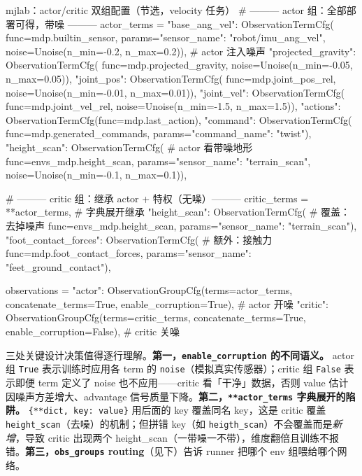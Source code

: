 \begin{codebox}[Python]{mjlab：actor/critic 双组配置（节选，velocity 任务）}
# ——— actor 组：全部部署可得，带噪 ———
actor_terms = {
    "base_ang_vel": ObservationTermCfg(
        func=mdp.builtin_sensor, params={"sensor_name": "robot/imu_ang_vel"},
        noise=Unoise(n_min=-0.2, n_max=0.2)),          # actor 注入噪声
    "projected_gravity": ObservationTermCfg(
        func=mdp.projected_gravity, noise=Unoise(n_min=-0.05, n_max=0.05)),
    "joint_pos": ObservationTermCfg(
        func=mdp.joint_pos_rel, noise=Unoise(n_min=-0.01, n_max=0.01)),
    "joint_vel": ObservationTermCfg(
        func=mdp.joint_vel_rel, noise=Unoise(n_min=-1.5, n_max=1.5)),
    "actions": ObservationTermCfg(func=mdp.last_action),
    "command": ObservationTermCfg(
        func=mdp.generated_commands, params={"command_name": "twist"}),
    "height_scan": ObservationTermCfg(                  # actor 看带噪地形
        func=envs_mdp.height_scan, params={"sensor_name": "terrain_scan"},
        noise=Unoise(n_min=-0.1, n_max=0.1)),
}

# ——— critic 组：继承 actor + 特权（无噪）———
critic_terms = {
    **actor_terms,                                      # 字典展开继承
    "height_scan": ObservationTermCfg(                  # 覆盖：去掉噪声
        func=envs_mdp.height_scan, params={"sensor_name": "terrain_scan"}),
    "foot_contact_forces": ObservationTermCfg(          # 额外：接触力
        func=mdp.foot_contact_forces,
        params={"sensor_name": "feet_ground_contact"}),
}

observations = {
    "actor":  ObservationGroupCfg(terms=actor_terms,  concatenate_terms=True,
                                  enable_corruption=True),   # actor 开噪
    "critic": ObservationGroupCfg(terms=critic_terms, concatenate_terms=True,
                                  enable_corruption=False),  # critic 关噪
}
\end{codebox}

三处关键设计决策值得逐行理解。\textbf{第一，\texttt{enable\_corruption} 的不同语义。} actor 组 \verb|True| 表示训练时应用各 term 的 \verb|noise|（模拟真实传感器）；critic 组 \verb|False| 表示即便 term 定义了 noise 也不应用——critic 看「干净」数据，否则 value 估计因噪声方差增大、advantage 信号质量下降。\textbf{第二，\texttt{**actor\_terms} 字典展开的陷阱。} \verb|{**dict, key: value}| 用后面的 key 覆盖同名 key，这是 critic 覆盖 \verb|height_scan|（去噪）的机制；但拼错 key（如 \verb|heigth_scan|）不会覆盖而是\emph{新增}，导致 critic 出现两个 height\_scan（一带噪一不带），维度翻倍且训练不报错。\textbf{第三，\texttt{obs\_groups} routing}（见下）告诉 runner 把哪个 env 组喂给哪个网络。

